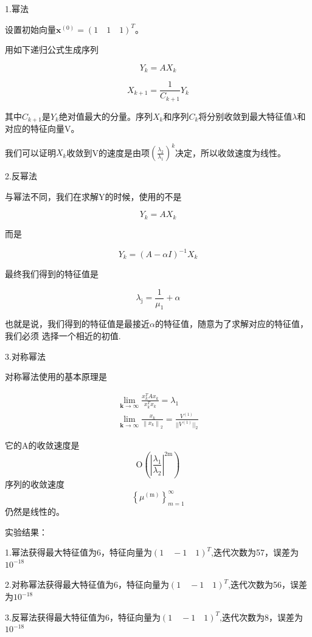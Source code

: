 \documentclass[UTF8]{ctexart}
\begin{document}
1.幂法

设置初始向量$ \mathbf{x}^{(0)}=(1\quad 1 \quad1)^{T} $。

用如下递归公式生成序列

$$
Y_k=AX_k
$$


$$
X_{k+1}=\frac{1}{C_{k+1}} Y_k
$$

其中$C_{k+1}$是$Y_k$绝对值最大的分量。序列{$X_k$}和序列{$C_k$}将分别收敛到最大特征值$\lambda$和对应的特征向量V。

我们可以证明$X_k$收敛到V的速度是由项$ (\frac{\lambda_2}{\lambda_1})^k$决定，所以收敛速度为线性。

2.反幂法

与幂法不同，我们在求解Y的时候，使用的不是

$$
Y_k=AX_k
$$

而是 

$$
Y_{k}=(A-\alpha I)^{-1} X_{k}
$$

最终我们得到的特征值是


$$
\lambda_{\mathrm{j}}=\frac{1}{\mu_{1}}+\alpha
$$

也就是说，我们得到的特征值是最接近$\alpha$的特征值，随意为了求解对应的特征值，我们必须
选择一个相近的初值.

3.对称幂法

对称幂法使用的基本原理是

$$
\begin{array}{c}{\lim _{\mathbf{k} \rightarrow \infty} \frac{x_{k}^{T} A x_{k}}{x_{k}^{T} x_{k}}=\lambda_{1}} \\ {\lim _{\mathbf{k} \rightarrow \infty} \frac{x_{k}}{\left\|x_{k}\right\|_{2}}=\frac{V^{(1)}}{|| V^{(1)}||_{2}}}\end{array}
$$


它的A的收敛速度是$$
\mathrm{O}\left(\left|\frac{\lambda_{1}}{\lambda_{2}}\right|^{2 \mathrm{m}}\right)
$$序列的收敛速度$$
\left\{\mu^{(\mathrm{m})}\right\}_{m=1}^{\infty}
$$仍然是线性的。





实验结果：

1.幂法获得最大特征值为6，特征向量为$ (1\quad -1 \quad1)^{T}$,迭代次数为57，误差为$ 10^{-18}$

2.对称幂法获得最大特征值为6，特征向量为$ (1\quad -1 \quad1)^{T}$,迭代次数为56，误差为$ 10^{-18}$


3.反幂法获得最大特征值为6，特征向量为$ (1\quad -1 \quad1)^{T}$,迭代次数为8，误差为$ 10^{-18}$
\end{document}

